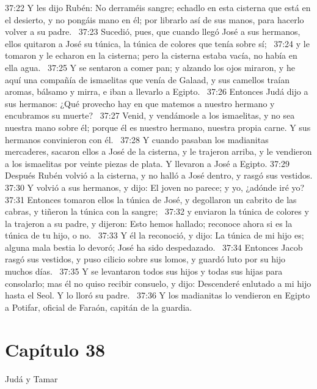 37:22 Y les dijo Rubén: No derraméis sangre; echadlo en esta cisterna que está en el desierto, y no pongáis mano en él; por librarlo así de sus manos, para hacerlo volver a su padre.  
37:23 Sucedió, pues, que cuando llegó José a sus hermanos, ellos quitaron a José su túnica, la túnica de colores que tenía sobre sí;  
37:24 y le tomaron y le echaron en la cisterna; pero la cisterna estaba vacía, no había en ella agua.  
37:25 Y se sentaron a comer pan; y alzando los ojos miraron, y he aquí una compañía de ismaelitas que venía de Galaad, y sus camellos traían aromas, bálsamo y mirra, e iban a llevarlo a Egipto.  
37:26 Entonces Judá dijo a sus hermanos: ¿Qué provecho hay en que matemos a nuestro hermano y encubramos su muerte?  
37:27 Venid, y vendámosle a los ismaelitas, y no sea nuestra mano sobre él; porque él es nuestro hermano, nuestra propia carne. Y sus hermanos convinieron con él.  
37:28 Y cuando pasaban los madianitas mercaderes, sacaron ellos a José de la cisterna, y le trajeron arriba, y le vendieron a los ismaelitas por veinte piezas de plata. Y llevaron a José a Egipto. 
37:29 Después Rubén volvió a la cisterna, y no halló a José dentro, y rasgó sus vestidos. 
37:30 Y volvió a sus hermanos, y dijo: El joven no parece; y yo, ¿adónde iré yo? 
37:31 Entonces tomaron ellos la túnica de José, y degollaron un cabrito de las cabras, y tiñeron la túnica con la sangre;  
37:32 y enviaron la túnica de colores y la trajeron a su padre, y dijeron: Esto hemos hallado; reconoce ahora si es la túnica de tu hijo, o no.  
37:33 Y él la reconoció, y dijo: La túnica de mi hijo es; alguna mala bestia lo devoró; José ha sido despedazado.  
37:34 Entonces Jacob rasgó sus vestidos, y puso cilicio sobre sus lomos, y guardó luto por su hijo muchos días.  
37:35 Y se levantaron todos sus hijos y todas sus hijas para consolarlo; mas él no quiso recibir consuelo, y dijo: Descenderé enlutado a mi hijo hasta el Seol. Y lo lloró su padre.  
37:36 Y los madianitas lo vendieron en Egipto a Potifar, oficial de Faraón, capitán de la guardia.  
\section*{Capítulo 38}
Judá y Tamar  

